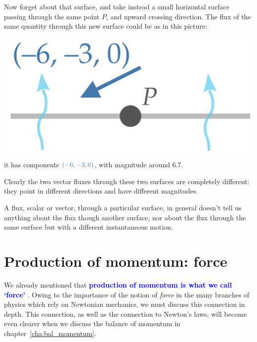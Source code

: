 \documentclass[a4paper,12pt,%
onecolumn,oneside,%
british%
]{memoir}
\providecommand{\href}[2]{#2}
\renewcommand*{\|}[1][]{\nonscript\:#1\vert\nonscript\:\mathopen{}}
\newcommand*{\sect}{\S}%
\newcommand*{\chap}{chapter}%
\newcommand*{\furl}[2]{\href{#1}{#2}\pagenote{\url{#1}}}
\renewcommand*{\autoref}[3][\sect\,\ref]{\textcolor{blue}{#3}
\raisebox{0.6ex}{\color{blue}\miniscule%
\faIcon{angle-right}%
\;#1{#2}\;p.\,\pageref{#2}}}
\begin{document}
Now forget about that surface, and take instead a small horizontal surface passing through the same point $P$, and upward crossing direction. The flux of the same quantity through this new surface could be as in this picture:
\begin{center}
  \includegraphics[align=c,scale=0.08]{images/skewfluxPy.pdf}
\end{center}
it has components $\mathcolor{blue}{(-6,-3,0)}$, with magnitude around \num{6.7}.

Clearly the two vector fluxes through these two surfaces are completely different: they point in different directions and have different magnitudes.

\begin{warning}
  A flux, scalar or vector, through a particular surface, in general doesn't tell us anything about the flux though another surface, nor about the flux through the same surface but with a different instantaneous motion.
\end{warning}


\section{Production of momentum: force}
\label{sec:force_is_production}

We already mentioned that \autoref{sec:intro_momentum}{\textbf{production of momentum is what we call \enquote*{force}}}. Owing to the importance of the notion of \emph{force} in the many branches of physics which rely on Newtonian mechanics, we must discuss this connection in depth. This connection, as well as the connection to Newton's laws, will become even clearer when we discuss the balance of momentum in \chap~\ref{cha:bal_momentum}.
\end{document}
